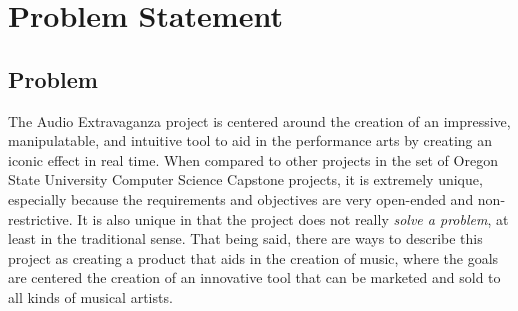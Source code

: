\documentclass[onecolumn, draftclsnofoot,10pt, compsoc]{IEEEtran}
\begin{document}
\newpage
{}
\tableofcontents
\clearpage

\section{Problem Statement}
\subsection{Problem}
    The Audio Extravaganza project is centered around the creation of an impressive, manipulatable, and intuitive tool to aid in the performance arts by creating an iconic effect in real time.
    When compared to other projects in the set of Oregon State University Computer Science Capstone projects, it is extremely unique, especially because the requirements and objectives are very open-ended and non-restrictive.
    It is also unique in that the project does not really \emph{solve a problem}, at least in the traditional sense.
    That being said, there are ways to describe this project as creating a product that aids in the creation of music, where the goals are centered the creation of an innovative tool that can be marketed and sold to all kinds of musical artists.
\end{document}
